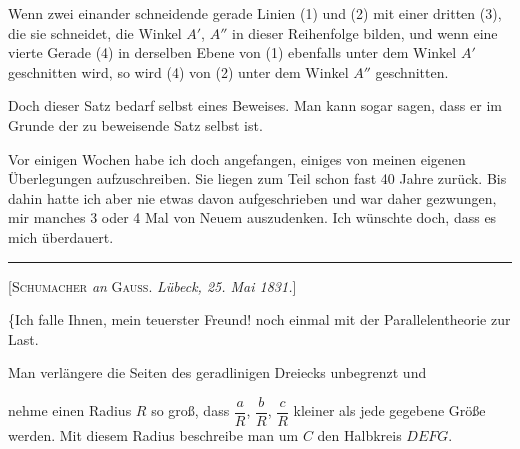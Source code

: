 

%
Wenn zwei einander schneidende gerade Linien (1) und (2) mit einer dritten (3), die sie schneidet, die Winkel $A'$, $A''$ in dieser Reihenfolge bilden, und wenn eine vierte Gerade (4) in derselben Ebene von (1) ebenfalls unter dem Winkel $A'$ geschnitten wird, so wird (4) von (2) unter dem Winkel $A''$ geschnitten.

Doch dieser Satz bedarf selbst eines Beweises. Man kann sogar sagen, dass er im Grunde der zu beweisende Satz selbst ist.

Vor einigen Wochen habe ich doch angefangen, einiges von meinen eigenen Überlegungen aufzuschreiben. Sie liegen zum Teil schon fast 40 Jahre zurück. Bis dahin hatte ich aber nie etwas davon aufgeschrieben und war daher gezwungen, mir manches 3 oder 4 Mal von Neuem auszudenken. Ich wünschte doch, dass es mich überdauert.

\bigskip
\hrule
\bigskip

\begin{center}
[\textsc{Schumacher} \emph{an} \textsc{Gauss}. \emph{Lübeck, 25. Mai 1831.}]
\end{center}

\{Ich falle Ihnen, mein teuerster Freund! noch einmal mit der Parallelentheorie zur Last.

Man verlängere die Seiten des geradlinigen Dreiecks unbegrenzt und

\begin{center}

\end{center}

\noindent nehme einen Radius $R$ so groß, dass $\dfrac{a}{R}$, $\dfrac{b}{R}$, $\dfrac{c}{R}$ kleiner als jede gegebene Größe werden. Mit diesem Radius beschreibe man um $C$ den Halbkreis $DEFG$.
